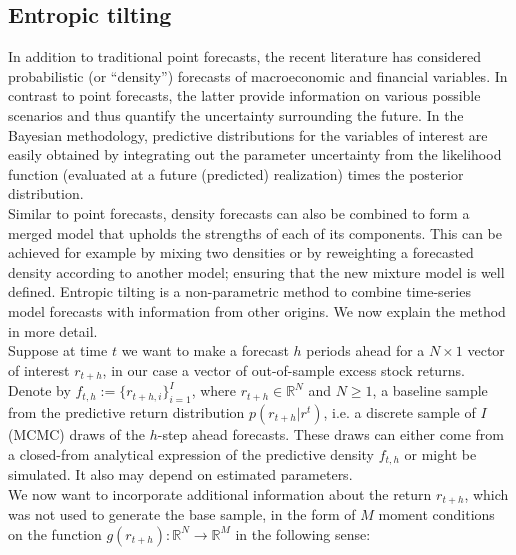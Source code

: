
\subsection{Entropic tilting}
In addition to traditional point forecasts, the recent literature has considered probabilistic (or ``density'') forecasts of macroeconomic and financial variables. In contrast to point forecasts, the latter provide information on various possible scenarios and thus quantify the uncertainty surrounding the future. %
In the Bayesian methodology, predictive distributions for the variables of interest are easily obtained by integrating out the parameter uncertainty from the likelihood function (evaluated at a future (predicted) realization) times the posterior distribution.\\
%
\indent Similar to point forecasts, density forecasts can also be combined to form a merged model that upholds the strengths of each of its components. This can be achieved for example by mixing two densities or by reweighting a forecasted density according to another model; ensuring that the new mixture model is well defined. Entropic tilting is a non-parametric method to combine time-series model forecasts with information from other origins. We now explain the method in more detail.\\
%
\indent Suppose at time $t$ we want to make a forecast $h$ periods ahead for a $N\times1$ vector of interest $r_{t+h}$, in our case a vector of out-of-sample excess stock returns. Denote by $f_{t,h}:=\{r_{t+h,i}\}_{i=1}^I$, where $r_{t+h}\in\mathbb{R}^N$ and $N\geq 1$, a baseline sample from the predictive return distribution $p(r_{t+h}|r^t)$, i.e. a discrete sample of $I$ (MCMC) draws of the $h$-step ahead forecasts. These draws can either come from a closed-from analytical expression of the predictive density $f_{t,h}$ or might be simulated. It also may depend on estimated parameters.\\
%
\indent We now want to incorporate additional information about the return $r_{t+h}$, which was not used to generate the base sample, in the form of $M$ moment conditions on the function $g(r_{t+h}):\mathbb{R}^N\to\mathbb{R}^M$  in the following sense:
